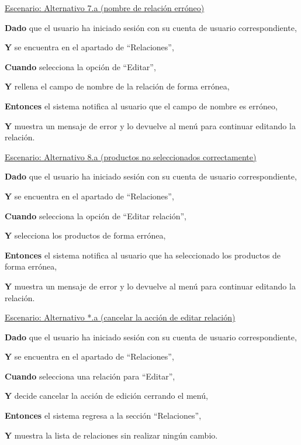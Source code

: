 \vspace{0.20cm}

\underline{Escenario: Alternativo 7.a (nombre de relación erróneo)}\par
\vspace{0.15cm}

\textbf{Dado} que el usuario ha iniciado sesión con su cuenta de usuario correspondiente,\par
\textbf{Y} se encuentra en el apartado de \enquote{Relaciones},\par
\textbf{Cuando} selecciona la opción de \enquote{Editar},\par
\textbf{Y} rellena el campo de nombre de la relación de forma errónea,\par
\textbf{Entonces} el sistema notifica al usuario que el campo de nombre es erróneo,\par
\textbf{Y} muestra un mensaje de error y lo devuelve al menú para continuar editando la relación.\par

\vspace{0.20cm}

\underline{Escenario: Alternativo 8.a (productos no seleccionados correctamente)}\par
\vspace{0.15cm}

\textbf{Dado} que el usuario ha iniciado sesión con su cuenta de usuario correspondiente,\par
\textbf{Y} se encuentra en el apartado de \enquote{Relaciones},\par
\textbf{Cuando} selecciona la opción de \enquote{Editar relación},\par
\textbf{Y} selecciona los productos de forma errónea,\par
\textbf{Entonces} el sistema notifica al usuario que ha seleccionado los productos de forma errónea,\par
\textbf{Y} muestra un mensaje de error y lo devuelve al menú para continuar editando la relación.\par

\vspace{0.20cm}

\underline{Escenario: Alternativo *.a (cancelar la acción de editar relación)}\par
\vspace{0.15cm}
\textbf{Dado} que el usuario ha iniciado sesión con su cuenta de usuario correspondiente,\par
\textbf{Y} se encuentra en el apartado de \enquote{Relaciones},\par
\textbf{Cuando} selecciona una relación para \enquote{Editar},\par
\textbf{Y} decide cancelar la acción de edición cerrando el menú,\par
\textbf{Entonces} el sistema regresa a la sección \enquote{Relaciones},\par
\textbf{Y} muestra la lista de relaciones sin realizar ningún cambio.\par


